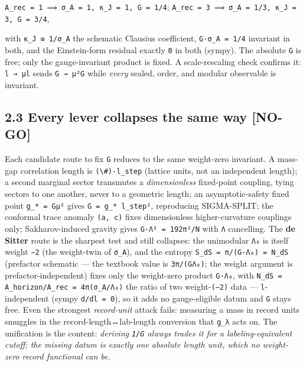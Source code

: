 \documentclass[11pt]{article}
\begin{document}
\texttt{A\_rec = 1 ⟹ σ\_A = 1, κ\_J = 1, G = 1/4};  \texttt{A\_rec = 3 ⟹ σ\_A = 1/3, κ\_J = 3, G = 3/4},

with \texttt{κ\_J ≡ 1/σ\_A} the schematic Clausius coefficient, \texttt{G·σ\_A = 1/4} invariant in both, and the Einstein-form residual exactly \texttt{0} in both (sympy). The absolute \texttt{G} is free; only the gauge-invariant product is fixed. A scale-rescaling check confirms it: \texttt{l → μl} sends \texttt{G → μ²G} while \emph{every} sealed, order, and modular observable is invariant.

\subsection*{2.3 Every lever collapses the same way [NO-GO]}
Each candidate route to fix \texttt{G} reduces to the same weight-zero invariant. A mass-gap correlation length is \texttt{(\textbackslash{}\#)·l\_step} (lattice units, not an independent length); a second marginal sector transmutes a \emph{dimensionless} fixed-point coupling, tying sectors to one another, never to a geometric length; an asymptotic-safety fixed point \texttt{g\_* = Gμ²} gives \texttt{G = g\_* l\_step²}, reproducing SIGMA-SPLIT; the conformal trace anomaly \texttt{(a, c)} fixes dimensionless higher-curvature couplings only; Sakharov-induced gravity gives \texttt{G·Λ² = 192π²/N} with \texttt{Λ} cancelling. The \textbf{de Sitter} route is the sharpest test and still collapses: the unimodular \texttt{Λ₀} is itself weight \texttt{−2} (the weight-twin of \texttt{σ\_A}), and the entropy \texttt{S\_dS = π/(G·Λ₀) = N\_dS} (prefactor schematic — the textbook value is \texttt{3π/(GΛ₀)}; the weight argument is prefactor-independent) fixes only the weight-zero product \texttt{G·Λ₀}, with \texttt{N\_dS = A\_horizon/A\_rec = 4π(σ\_A/Λ₀)} the ratio of two weight-\texttt{(−2)} data — \texttt{l}-independent (sympy \texttt{d/dl = 0}), so it adds no gauge-eligible datum and \texttt{G} stays free. Even the strongest \emph{record-unit} attack fails: measuring a mass in record units smuggles in the record-length↔lab-length conversion that \texttt{g\_λ} acts on. The unification is the content: \emph{deriving \texttt{1/G} always trades it for a labeling-equivalent cutoff; the missing datum is exactly one absolute length unit, which no weight-zero record functional can be.}
\end{document}
